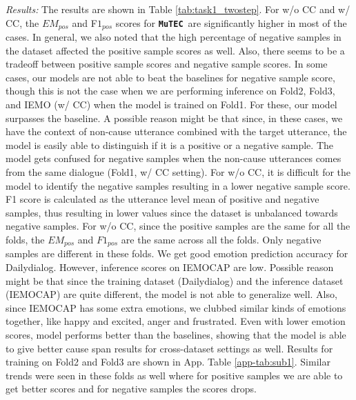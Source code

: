 \documentclass{article}
\newcommand{\modelname}{\textbf{\texttt{MuTEC}}}
\begin{document}
\noindent\textit{Results:} The results are shown in Table \ref{tab:task1_twostep}. For w/o CC and w/ CC, the $EM_{pos}$ and F$1_{pos}$ scores for \modelname\ are significantly higher in most of the cases. 
In general, we also noted that the high percentage of negative samples in the dataset affected the positive sample scores as well. Also, there seems to be a tradeoff between positive sample scores and negative sample scores. In some cases, our models are not able to beat the baselines for negative sample score, though this is not the case when we are performing inference on Fold2, Fold3, and IEMO (w/ CC) when the model is trained on Fold1. For these, our model surpasses the baseline. A possible reason might be that since, in these cases, we have the context of non-cause utterance combined with the target utterance, the model is easily able to distinguish if it is a positive or a negative sample. The model gets confused for negative samples when the non-cause utterances comes from the same dialogue (Fold1, w/ CC setting). For w/o CC, it is difficult for the model to identify the negative samples resulting in a lower negative sample score. F1 score is calculated as the utterance level mean of positive and negative samples, thus resulting in lower values since the dataset is unbalanced towards negative samples. For w/o CC, since the positive samples are the same for all the folds, the $EM_{pos}$ and $F1_{pos}$ are the same across all the folds. Only negative samples are different in these folds. 
We get good emotion prediction accuracy for Dailydialog. However, inference scores on IEMOCAP are low. Possible reason might be that since the training dataset (Dailydialog) and the inference dataset (IEMOCAP) are quite different, the model is not able to generalize well. Also, since IEMOCAP has some extra emotions, we clubbed similar kinds of emotions together, like happy and excited, anger and frustrated. Even with lower emotion scores, model performs better than the baselines, showing that the model is able to give better cause span results for cross-dataset settings as well. Results for training on Fold2 and Fold3 are shown in App. Table \ref{app-tab:sub1}. Similar trends were seen in these folds as well where for positive samples we are able to get better scores and for negative samples the scores drops. 
\end{document}
